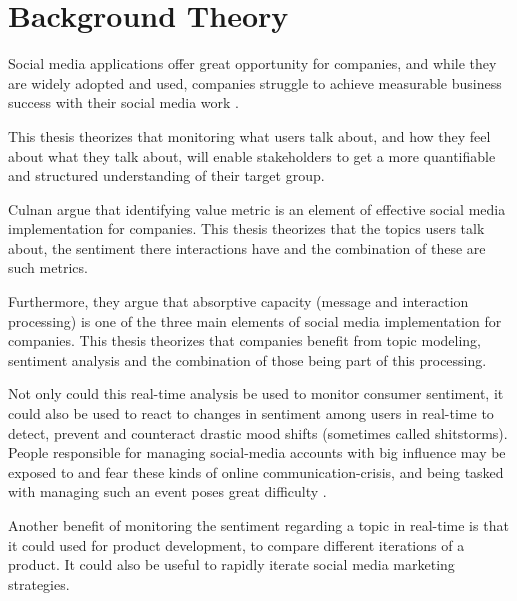 
\chapter{Background Theory}

\label{ch:backgroundTheory}


Social media applications offer great opportunity for companies,
and while they are widely adopted and used,
companies struggle to achieve measurable business success with their social media work \cite{Culnan2015}.
\par
This thesis theorizes that monitoring what users talk about,
and how they feel about what they talk about,
will enable stakeholders to get a more quantifiable and structured understanding of their target group.
\par
Culnan \etAl \cite{Culnan2015} %
argue that identifying value metric is an element of effective social media implementation for companies.
This thesis theorizes that the topics users talk about, the sentiment there interactions have and the combination of these are such metrics.
\par
Furthermore, they argue that absorptive capacity (message and interaction processing) is one of the three main elements of social media implementation for companies.
This thesis theorizes that companies benefit from topic modeling, sentiment analysis and the combination of those being part of this processing.
\par
Not only could this real-time analysis be used to monitor consumer sentiment,
it could also be used to react to changes in sentiment among users in real-time to detect, prevent and counteract
drastic mood shifts (sometimes called shitstorms).
People responsible for managing social-media accounts with big influence may be exposed to and fear these kinds of online communication-crisis,
and being tasked with managing such an event poses great difficulty \cite{Salzborn2015}.
\par
Another benefit of monitoring the sentiment regarding a topic in real-time is that it could used for product development,
to compare different iterations of a product.
It could also be useful to rapidly iterate social media marketing strategies.
